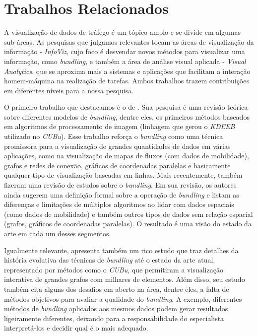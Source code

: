 \chapter{Trabalhos Relacionados}
\label{cap:trabalhos-relacionados}

  A visualização de dados de tráfego é um tópico amplo e se divide em algumas
sub-áreas. As pesquisas que julgamos relevantes tocam as áreas de visualização
da informação - \emph{InfoViz}, cujo foco é desvendar novos métodos para
visualizar uma informação, como \emph{bundling}, e também a área de análise
visual aplicada - \emph{Visual Analytics}, que se aproxima mais a sistemas e
aplicações que facilitam a interação homem-máquina na realização de tarefas.
Ambos trabalhos trazem contribuições em diferentes níveis para a nossa pesquisa.

O primeiro trabalho que destacamos é o de \citet{Zhou2013}. Sua pesquisa é uma
revisão teórica sobre diferentes modelos de \emph{bundling}, dentre eles, os
primeiros métodos baseados em algoritmos de processamento de imagem (linhagem
que gerou o \emph{KDEEB} utilizado no \emph{CUBu}). Esse trabalho reforça o
\emph{bundling} como uma técnica promissora para a visualização de grandes
quantidades de dados em várias aplicações, como na visualização de mapas de
fluxos (com dados de mobilidade), grafos e redes de conexão, gráficos de
coordenadas paralelas e basicamente qualquer tipo de visualização baseadas em
linhas. Mais recentemente, \citet{Lhuillier2017} também fizeram uma revisão de
estudos sobre o \emph{bundling}. Em sua revisão, os autores ainda
sugerem uma definição formal sobre a operação de \emph{bundling} e listam as
diferenças e limitações de múltiplos algoritmos ao lidar com dados espaciais
(como dados de mobilidade) e também outros tipos de dados sem relação espacial
(grafos, gráficos de coordenadas paralelas). O resultado é uma visão do estado
da arte em cada um desses segmentos.

Igualmente relevante, \citet{Telea2018} apresenta também um rico estudo que traz
detalhes da história evolutiva das técnicas de \emph{bundling} até o estado da
arte atual, representado por métodos como o \emph{CUBu}, que permitiram a
visualização interativa de grandes grafos com milhares de elementos. Além disso,
seu estudo também cita alguns dos desafios em aberto na área, dentre eles, a
falta de métodos objetivos para avaliar a qualidade do \emph{bundling}. A exemplo,
diferentes métodos de \emph{bundling} aplicados aos mesmos dados podem gerar resultados
ligeiramente diferentes, deixando para a responsabilidade do especialista interpretá-los
e decidir qual é o mais adequado.

